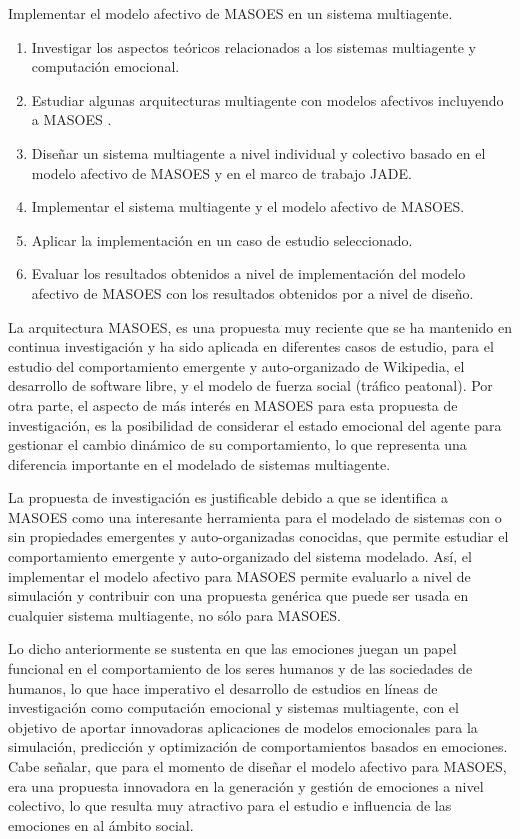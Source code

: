 Implementar el modelo afectivo de MASOES en un sistema multiagente.


\begin{enumerate}
\item Investigar los aspectos teóricos relacionados a los sistemas multiagente y computación emocional.
\item Estudiar algunas arquitecturas multiagente con modelos afectivos incluyendo a MASOES \citep{perozo2011}.
\item Diseñar un sistema multiagente a nivel individual y colectivo basado en el modelo afectivo de MASOES y en el marco de trabajo JADE.
\item Implementar el sistema multiagente y el modelo afectivo de MASOES.
\item Aplicar la implementación en un caso de estudio seleccionado.
\item Evaluar los resultados obtenidos a nivel de implementación del modelo afectivo de MASOES con los resultados obtenidos por \cite{perozo2011} a nivel de diseño.
\end{enumerate}


La arquitectura MASOES, es una propuesta muy reciente que se ha mantenido en
continua investigación y ha sido aplicada en diferentes casos de estudio, para
el estudio del comportamiento emergente y auto-organizado de Wikipedia, el
desarrollo de software libre, y el modelo de fuerza social (tráfico peatonal).
Por otra parte, el aspecto de más interés en MASOES para esta propuesta de
investigación, es la posibilidad de considerar el estado emocional del agente
para gestionar el cambio dinámico de su comportamiento, lo que representa una
diferencia importante en el modelado de sistemas multiagente.

La propuesta de investigación es justificable debido a que se identifica a
MASOES como una interesante herramienta para el modelado de sistemas con o sin
propiedades emergentes y auto-organizadas conocidas, que permite estudiar el
comportamiento emergente y auto-organizado del sistema modelado. Así, el
implementar el modelo afectivo para MASOES permite evaluarlo a nivel de
simulación y contribuir con una propuesta genérica que puede ser usada en
cualquier sistema multiagente, no sólo para MASOES.

Lo dicho anteriormente se sustenta en que las emociones juegan un papel
funcional en el comportamiento de los seres humanos y de las sociedades de
humanos, lo que hace imperativo el desarrollo de estudios en líneas de
investigación como  computación emocional y sistemas multiagente, con el
objetivo de aportar innovadoras aplicaciones de modelos emocionales para la
simulación, predicción y optimización de comportamientos basados en emociones.
Cabe señalar, que para el momento de diseñar el modelo afectivo para MASOES, era
una propuesta innovadora en la generación y gestión de emociones a nivel
colectivo, lo que resulta muy atractivo para el estudio e influencia de las
emociones en al ámbito social.

